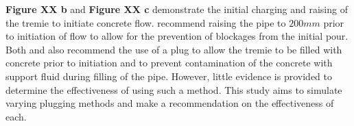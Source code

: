 \noindent
{\bfseries Figure XX b} and {\bfseries Figure XX c} demonstrate the initial charging and raising of the tremie to initiate concrete flow.  recommend raising the pipe to $200mm$ prior to initiation of flow to allow for the prevention of blockages from the initial pour. Both  and  also recommend the use of a plug to allow the tremie to be filled with concrete prior to initiation and to prevent contamination of the concrete with support fluid during filling of the pipe. However, little evidence is provided to determine the effectiveness of using such a method. This study aims to simulate varying plugging methods and make a recommendation on the effectiveness of each. 




















